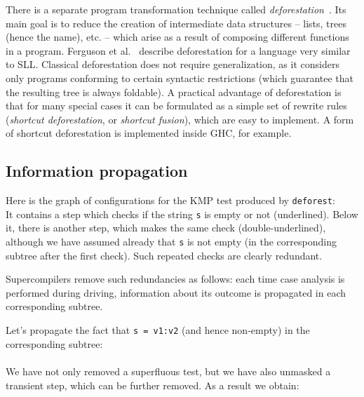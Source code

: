 
There is a separate program transformation technique 
called \emph{deforestation}~\cite{Wadler1988deforestation,Ferguson1988When}.
Its main goal is to reduce the creation of intermediate data structures
-- lists, trees (hence the name), etc. -- which arise as a result of
composing different functions in a program.
Ferguson et al.~\cite{Ferguson1988When} describe deforestation for a language
very similar to SLL\@.
Classical deforestation does not require generalization, as it considers
only programs conforming to certain syntactic restrictions
(which guarantee that the resulting tree is always foldable).
A practical advantage of deforestation is that for
many special cases it can be formulated as a simple set of
rewrite rules (\emph{shortcut deforestation}, or \emph{shortcut fusion}),
which are easy to implement. 
A form of shortcut deforestation is implemented inside GHC, for example.

\subsection{Information propagation}

Here is the graph of configurations for the KMP test produced by \texttt{deforest}:\\


It contains a step which checks if the string \texttt{s} is empty or not (underlined).
Below it, there is another step, which makes the same check (double-underlined),
although we have assumed already that \texttt{s} is not empty 
(in the corresponding subtree after the first check). 
Such repeated checks are clearly redundant.

Supercompilers remove such redundancies as follows:
each time case analysis is performed during driving,
information about its outcome is propagated in each corresponding subtree.

Let's propagate the fact that \texttt{s = v1:v2} (and hence non-empty) in the corresponding subtree:\\
\\
We have not only removed a superfluous test, but we have also unmasked
a transient step, which can be further removed.
As a result we obtain:\\


